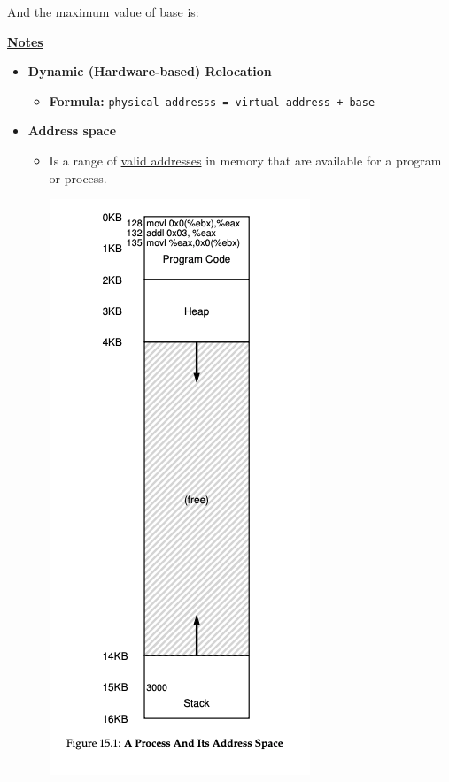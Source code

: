 \documentclass[12pt]{article}
\begin{document}
\begin{enumerate}[1.]
    \bigskip

    And the maximum value of base is:

    \bigskip

    \underline{\textbf{Notes}}

    \begin{itemize}
        \item \textbf{Dynamic (Hardware-based) Relocation}

        \begin{itemize}
            \item \textbf{Formula:} \texttt{physical addresss = virtual address + base}
        \end{itemize}
        \item \textbf{Address space}

        \begin{itemize}
            \item Is a range of \underline{valid addresses} in memory that are available for
            a program or process.

            \bigskip

            \begin{center}
            \includegraphics[width=0.4\linewidth]{images/worksheet_7_solution_6.png}
            \end{center}


        \end{itemize}
    \end{itemize}


\end{enumerate}
\end{document}

